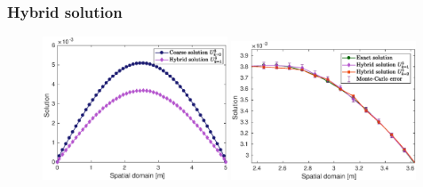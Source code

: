 \documentclass[10 pt]{beamer}
\begin{document}
\begin{frame}
\frametitle{Hybrid solution}
  \begin{figure}
\centering
\includegraphics[width=0.49\textwidth]{image/Coarse_solution_vs_hybrid_n=5}
\includegraphics[width=0.49\textwidth]{image/hybrid_sol_MC_error_bar_zoom_bis} 
\end{figure}
\end{frame}
%
\end{document}
